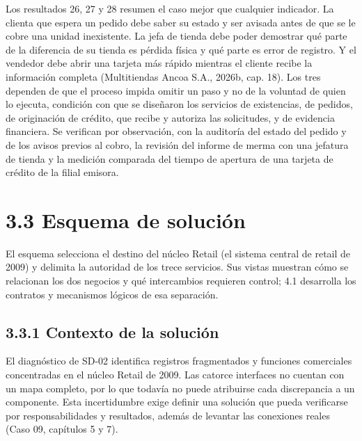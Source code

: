 \documentclass[11pt]{article}
\begin{document}
Los resultados 26, 27 y 28 resumen el caso mejor que cualquier indicador. La clienta que espera un pedido debe saber su estado y ser avisada antes de que se le cobre una unidad inexistente. La jefa de tienda debe poder demostrar qué parte de la diferencia de su tienda es pérdida física y qué parte es error de registro. Y el vendedor debe abrir una tarjeta más rápido mientras el cliente recibe la información completa (Multitiendas Ancoa S.A., 2026b, cap. 18). Los tres dependen de que el proceso impida omitir un paso y no de la voluntad de quien lo ejecuta, condición con que se diseñaron los servicios de existencias, de pedidos, de originación de crédito, que recibe y autoriza las solicitudes, y de evidencia financiera. Se verifican por observación, con la auditoría del estado del pedido y de los avisos previos al cobro, la revisión del informe de merma con una jefatura de tienda y la medición comparada del tiempo de apertura de una tarjeta de crédito de la filial emisora.

\section{3.3 Esquema de solución}

El esquema selecciona el destino del núcleo Retail (el sistema central de retail de 2009) y delimita la autoridad de los trece servicios. Sus vistas muestran cómo se relacionan los dos negocios y qué intercambios requieren control; 4.1 desarrolla los contratos y mecanismos lógicos de esa separación.

\subsection{3.3.1 Contexto de la solución}

{El diagnóstico de SD-02 identifica registros fragmentados y funciones comerciales concentradas en el núcleo Retail de 2009. Las catorce interfaces no cuentan con un mapa completo, por lo que todavía no puede atribuirse cada discrepancia a un componente. Esta incertidumbre exige definir una solución que pueda verificarse por responsabilidades y resultados, además de levantar las conexiones reales (Caso 09, capítulos 5 y 7).}
\end{document}
